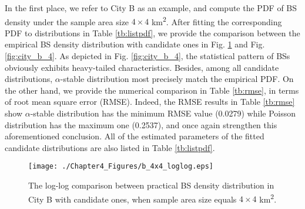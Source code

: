 In the first place, we refer to City B as an example, and compute the PDF of BS density under the sample area size $4\times4$ km\textsuperscript{2}. After fitting the corresponding PDF to distributions in Table \ref{tb:listpdf}, we provide the comparison between the empirical BS density distribution with candidate ones in Fig. \ref{fig:city_b_log4} and Fig. \ref{fig:city_b_4}. As depicted in Fig. \ref{fig:city_b_4}, the statistical pattern of BSs obviously exhibits heavy-tailed characteristics. Besides, among all candidate distributions, $\alpha$-stable distribution most precisely match the empirical PDF. On the other hand, we provide the numerical comparison in Table \ref{tb:rmse}, in terms of root mean square error (RMSE). Indeed, the RMSE results in Table \ref{tb:rmse} show $\alpha$-stable distribution has the minimum RMSE value (0.0279) while Poisson distribution has the maximum one (0.2537), and once again strengthen this aforementioned conclusion. All of the estimated parameters of the fitted candidate distributions are also listed in Table \ref{tb:listpdf}.

\begin{figure}
\centering
\texttt{[image: ./Chapter4\_Figures/b\_4x4\_loglog.eps]}
 \setlength\abovecaptionskip{0pt}
 \setlength\belowcaptionskip{-5pt}
\caption{The log-log comparison between practical BS density distribution in City B with candidate ones, when sample area size equals $4\times4$ km\textsuperscript{2}.}
\label{fig:city_b_log4}
\end{figure}
%

